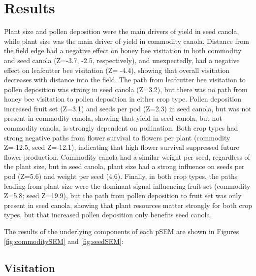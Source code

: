 \documentclass[12pt]{article} %
\begin{document}
\section{Results}

Plant size and pollen deposition were the main drivers of yield in seed canola, while plant size was the main driver of yield in commodity canola.
Distance from the field edge had a negative effect on honey bee visitation in both commodity and seed canola (Z=-3.7, -2.5, respectively), and unexpectedly, had a negative effect on leafcutter bee visitation (Z= -4.4), showing that overall visitation decreases with distance into the field.
The path from leafcutter bee visitation to pollen deposition was strong in seed canola (Z=3.2), but there was no path from honey bee visitation to pollen deposition in either crop type.
Pollen deposition increased fruit set (Z=3.1) and seeds per pod (Z=2.3) in seed canola, but was not present in commodity canola, showing that yield in seed canola, but not commodity canola, is strongly dependent on pollination.
Both crop types had strong negative paths from flower survival to flowers per plant (commodity Z=-12.5, seed Z=-12.1), indicating that high flower survival suppressed future flower production.
Commodity canola had a similar weight per seed, regardless of the plant size, but in seed canola, plant size had a strong influence on seeds per pod (Z=5.6) and weight per seed (4.6).
Finally, in both crop types, the paths leading from plant size were the dominant signal influencing fruit set (commodity Z=5.8; seed Z=19.9), but the path from pollen deposition to fruit set was only present in seed canola, showing that plant resources matter strongly for both crop types, but that increased pollen deposition only benefits seed canola.

The results of the underlying components of each pSEM are shown in Figures \ref{fig:commoditySEM} and \ref{fig:seedSEM}:

\subsection{Visitation}
\end{document}
